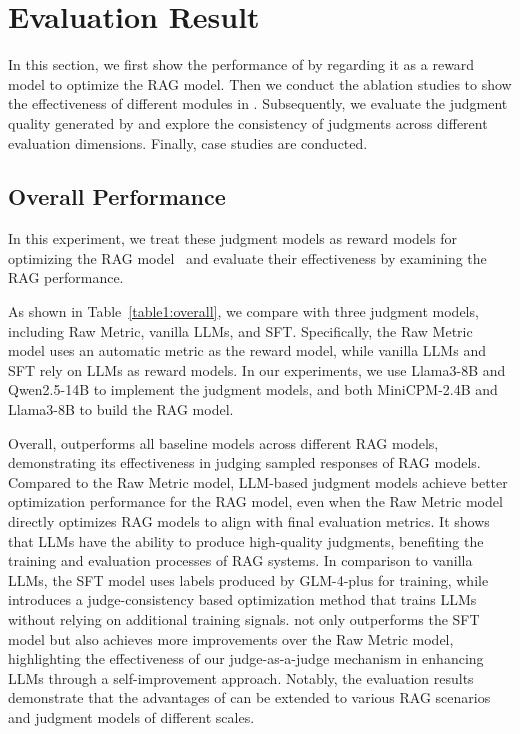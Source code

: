 \section{Evaluation Result}
In this section, we first show the performance of \method{} by regarding it as a reward model to optimize the RAG model. Then we conduct the ablation studies to show the effectiveness of different modules in \method{}. Subsequently, we evaluate the judgment quality generated by \method{} and explore the consistency of judgments across different evaluation dimensions. Finally, case studies are conducted.

\subsection{Overall Performance}
\label{sec:5.1}
In this experiment, we treat these judgment models as reward models for optimizing the RAG model~\cite{rag-ddr2024Li} and evaluate their effectiveness by examining the RAG performance.

As shown in Table~\ref{table1:overall}, we compare \method{} with three judgment models, including Raw Metric, vanilla LLMs, and SFT. Specifically, the Raw Metric model uses an automatic metric as the reward model, while vanilla LLMs and SFT rely on LLMs as reward models. In our experiments, we use Llama3-8B and Qwen2.5-14B to implement the judgment models, and both MiniCPM-2.4B and Llama3-8B to build the RAG model.

Overall, \method{} outperforms all baseline models across different RAG models, demonstrating its effectiveness in judging sampled responses of RAG models. Compared to the Raw Metric model, LLM-based judgment models achieve better optimization performance for the RAG model, even when the Raw Metric model directly optimizes RAG models to align with final evaluation metrics. It shows that LLMs have the ability to produce high-quality judgments, benefiting the training and evaluation processes of RAG systems.
In comparison to vanilla LLMs, the SFT model uses labels produced by GLM-4-plus for training, while \method{} introduces a judge-consistency based optimization method that trains LLMs without relying on additional training signals. \method{} not only outperforms the SFT model but also achieves more improvements over the Raw Metric model, highlighting the effectiveness of our judge-as-a-judge mechanism in enhancing LLMs through a self-improvement approach. Notably, the evaluation results demonstrate that the advantages of \method{} can be extended to various RAG scenarios and judgment models of different scales.





